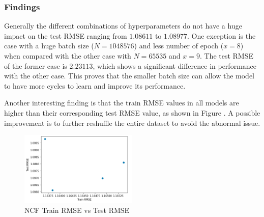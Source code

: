 \documentclass[final]{cvpr}
\begin{document}
\subsubsection{Findings}
Generally the different combinations of hyperparameters do not have a huge impact on the test RMSE ranging from $1.08611$ to $1.08977$.
One exception is the case with a huge batch size ($N=1048576$) and less number of epoch ($x = 8$)
when compared with the other case with $N=65535$ and $x=9$.
The test RMSE of the former case is $2.23113$,
which shows a significant difference in performance with the other case.
This proves that the smaller batch size can allow the model to have more cycles to learn and improve its performance.

Another interesting finding is that the train RMSE values in all models
are higher than their corresponding test RMSE value,
as shown in Figure \label{fig:ncf-rmse-scatter}.
A possible improvement is to further reshuffle the entire dataset to avoid the abnormal issue.

\begin{figure}
	\includegraphics[width=0.5\textwidth]{screenshot20210422234958.png}
	\caption{\ac{NCF} Train \ac{RMSE} vs Test \ac{RMSE}}
	\label{fig:ncf-rmse-scatter}
\end{figure}

{\small
	
	
}
\end{document}
